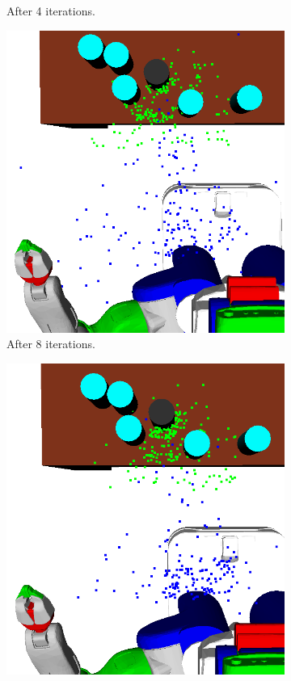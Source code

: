 \begin{figure}[t]
\begin{subfigure}[b]{0.35\linewidth}
    \caption{After 4 iterations.}
  \end{subfigure}
  \begin{subfigure}[b]{0.35\linewidth}
    \includegraphics[width=\textwidth]{images/learn8.png}
    \caption{After 8 iterations.}
  \end{subfigure}
  \begin{subfigure}[b]{0.35\linewidth}
    \includegraphics[width=\textwidth]{images/learn12.png}

\end{subfigure}
\end{figure}
